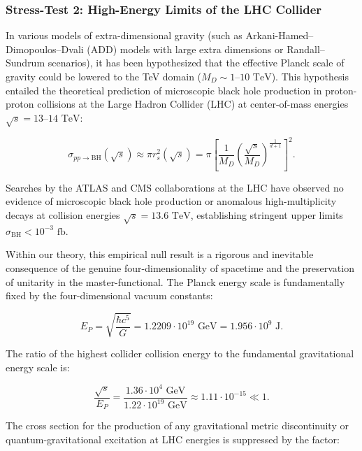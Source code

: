 \subsubsection{Stress-Test 2: High-Energy Limits of the LHC Collider}\label{sec:5.4.2}

In various models of extra-dimensional gravity (such as Arkani-Hamed--Dimopoulos--Dvali (ADD) models with large extra dimensions or Randall--Sundrum scenarios), it has been hypothesized that the effective Planck scale of gravity could be lowered to the TeV domain ($M_D \sim 1\text{--}10\text{ TeV}$). This hypothesis entailed the theoretical prediction of microscopic black hole production in proton-proton collisions at the Large Hadron Collider (LHC) at center-of-mass energies $\sqrt{s} = 13\text{--}14\text{ TeV}$:

\begin{equation}\label{eq:5.59}\tag{5.59}
\sigma_{pp \to \text{BH}}(\sqrt{s}) \approx \pi r_s^2(\sqrt{s}) = \pi \left[ \frac{1}{M_D} \left( \frac{\sqrt{s}}{M_D} \right)^{\frac{1}{d+1}} \right]^2.
\end{equation}

Searches by the ATLAS and CMS collaborations at the LHC have observed no evidence of microscopic black hole production or anomalous high-multiplicity decays at collision energies $\sqrt{s} = 13.6\text{ TeV}$, establishing stringent upper limits $\sigma_{\text{BH}} < 10^{-3}\text{ fb}$.

Within our theory, this empirical null result is a rigorous and inevitable consequence of the genuine four-dimensionality of spacetime and the preservation of unitarity in the master-functional. The Planck energy scale is fundamentally fixed by the four-dimensional vacuum constants:

\begin{equation}\label{eq:5.60}\tag{5.60}
E_P = \sqrt{\frac{\hbar c^5}{G}} = 1.2209 \cdot 10^{19}\text{ GeV} = 1.956 \cdot 10^9\text{ J}.
\end{equation}

The ratio of the highest collider collision energy to the fundamental gravitational energy scale is:

\begin{equation}\label{eq:5.61}\tag{5.61}
\frac{\sqrt{s}}{E_P} = \frac{1.36 \cdot 10^4\text{ GeV}}{1.22 \cdot 10^{19}\text{ GeV}} \approx 1.11 \cdot 10^{-15} \ll 1.
\end{equation}

The cross section for the production of any gravitational metric discontinuity or quantum-gravitational excitation at LHC energies is suppressed by the factor:

